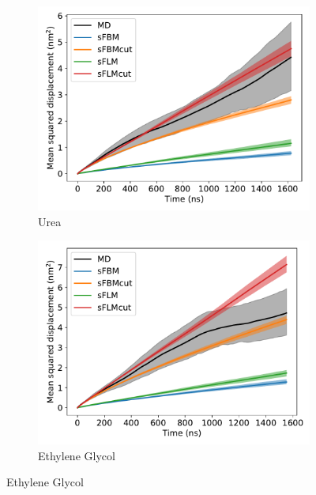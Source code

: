 \documentclass{article}
\begin{document}
  \begin{figure}
  \centering
  \begin{subfigure}{0.45\textwidth}
  \includegraphics[width=\textwidth]{1mode_msd_comparison_URE.pdf}
  \caption{Urea}\label{fig:1mode_msd_comparison_URE}
  \end{subfigure}
  \begin{subfigure}{0.45\textwidth}
  \includegraphics[width=\textwidth]{1mode_msd_comparison_GCL.pdf}
  \caption{Ethylene Glycol}\label{fig:1mode_msd_comparison_GCL}
  \end{subfigure}

\end{figure}
\end{document}
